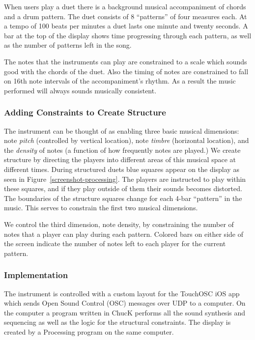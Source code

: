 \documentclass{article}
\begin{document}
When users play a duet there is a background musical accompaniment of chords and a drum pattern.  The duet consists of 8 ``patterns'' of four measures each.  At a tempo of 100 beats per minutes a duet lasts one minute and twenty seconds.  A bar at the top of the display shows time progressing through each pattern, as well as the number of patterns left in the song.  

The notes that the instruments can play are constrained to a scale which sounds good with the chords of the duet.  Also the timing of notes are constrained to fall on 16th note intervals of the accompaniment's rhythm.  As a result the music performed will always sounds musically consistent.

\subsubsection{Adding Constraints to Create Structure}

The instrument can be thought of as enabling three basic musical dimensions: note \emph{pitch} (controlled by vertical location), note \emph{timbre} (horizontal location), and the \emph{density} of notes (a function of how frequently notes are played.)  We create structure by directing the players into different areas of this musical space at different times. During structured duets blue squares appear on the display as seen in Figure~\ref{screenshot-processing}.  The players are instructed to play within these squares, and if they play outside of them their sounds becomes distorted. The boundaries of the structure squares change for each 4-bar “pattern” in the music. This serves to constrain the first two musical dimensions.

We control the third dimension, note density, by constraining the number of notes that a player can play during each pattern. Colored bars on either side of the screen indicate the number of notes left to each player for the current pattern.


\subsubsection{Implementation}

The instrument is controlled with a custom layout for the TouchOSC iOS app which sends Open Sound Control (OSC) messages over UDP to a computer.  On the computer a program written in ChucK performs all the sound synthesis and sequencing as well as the logic for the structural constraints. The display is created by a Processing program on the same computer.
\end{document}
